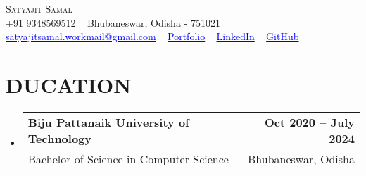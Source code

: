 \documentclass[letterpaper,11pt]{article}
\makeatletter
\newcommand{\resumeSubheading}[4]{
  \vspace{-2pt}\item
    \begin{tabular*}{1.0\textwidth}[t]{l@{\extracolsep{\fill}}r}
      \textbf{#1} & \textbf{\small #2} \\
      #3 & #4 \\
    \end{tabular*}\vspace{-7pt}
}
\newcommand{\resumeSubHeadingListStart}{\begin{itemize}[leftmargin=0.0in, label={}]}
\newcommand{\resumeSubHeadingListEnd}{\end{itemize}}
\makeatother
\begin{document}

\begin{center}
    {\Huge \scshape Satyajit Samal} \\ \vspace{5pt}
    \small {} +91 9348569512 ~ {\raisebox{-0.1\height}\faMapMarkerAlt} Bhubaneswar, Odisha - 751021 \\ \vspace{5pt}
    \href{satyajitsamal.workmail@gmail.com}
    {\raisebox{-0.2\height}\faEnvelope} \underline{\textcolor{blue}{satyajitsamal.workmail@gmail.com}} ~ 
    \href{https://satyajit-samal.vercel.app/}{\raisebox{-0.2\height}\faLaptopCode} \underline{\textcolor{blue}{Portfolio}} ~ 
    \href{https://linkedin.com/in/satyajitsamal/}{\raisebox{-0.2\height}\faLinkedin} \underline{\textcolor{blue}{LinkedIn}} ~
    \href{https://github.com/s-satyajit}{\raisebox{-0.2\height}\faGithub} \underline{\textcolor{blue}{GitHub}}
    \vspace{6pt}
\end{center}



\section{\textrm{\scalebox{1.2}{E}DUCATION}}

  \resumeSubHeadingListStart
    \resumeSubheading
      {Biju Pattanaik University of Technology}{Oct 2020 -- July 2024}
      {Bachelor of Science in Computer Science}{Bhubaneswar, Odisha}
      \vspace{6pt}
  \resumeSubHeadingListEnd
\end{document}
